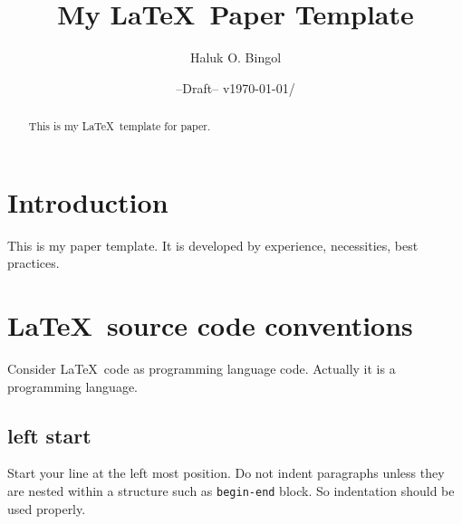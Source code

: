 \documentclass[pre,twocolumn,showkeys,longbibliography]{revtex4-1}
\newcommand{\hbTimeStamp}{{\color{red}--Draft-- v\today/\currenttime}} %
\theoremstyle{plain}%
\theoremstyle{definition}
\theoremstyle{remark}
\begin{document}



\title{
	My \LaTeX\ Paper Template 
}
\author{Haluk O. Bingol}

\date{\hbTimeStamp}

\begin{abstract}
	This is my \LaTeX\ template for paper.
\end{abstract}




\maketitle
\tableofcontents





\section{Introduction}

This is my paper template. 
It is developed by experience, necessities, best practices.





\section{\LaTeX\ source code conventions}

Consider \LaTeX\ code as programming language code. 
Actually it is a programming language.





\subsection{left start}

Start your line at the left most position.
Do not indent paragraphs unless they are nested within a structure such as \verb!begin-end! block.
So indentation should be used properly.
\end{document}
